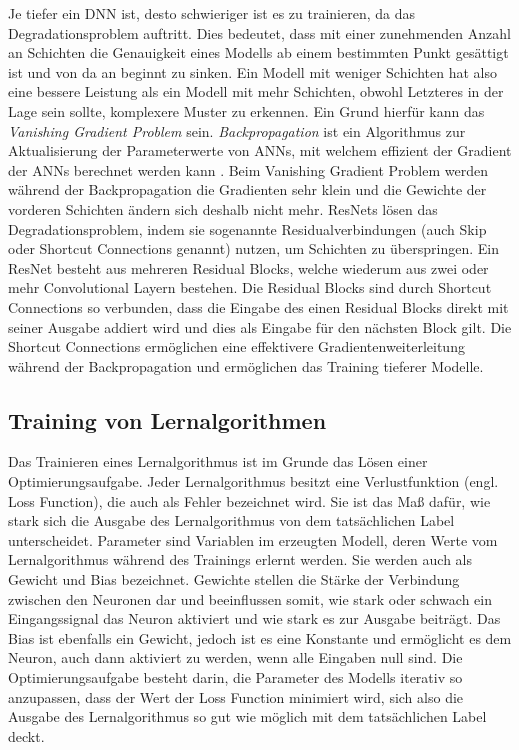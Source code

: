  
Je tiefer ein \gls{DNN} ist, desto schwieriger ist es zu trainieren, da das Degradationsproblem auftritt. Dies bedeutet, dass mit einer zunehmenden Anzahl an Schichten die Genauigkeit eines Modells ab einem bestimmten Punkt gesättigt ist und von da an beginnt zu sinken. Ein Modell mit weniger Schichten hat also eine bessere Leistung als ein Modell mit mehr Schichten, obwohl Letzteres in der Lage sein sollte, komplexere Muster zu erkennen. Ein Grund hierfür kann das \textit{Vanishing Gradient Problem} sein. \textit{Backpropagation} ist ein Algorithmus zur Aktualisierung der Parameterwerte von \gls{ANN}s, mit welchem effizient der Gradient der \gls{ANN}s berechnet werden kann \cite{burkov_machine_2019}. Beim Vanishing Gradient Problem werden während der Backpropagation die Gradienten sehr klein und die Gewichte der vorderen Schichten ändern sich deshalb nicht mehr. 
\glspl{ResNet} lösen das Degradationsproblem, indem sie sogenannte Residualverbindungen (auch Skip oder Shortcut Connections genannt) nutzen, um Schichten zu überspringen. Ein \gls{ResNet} besteht aus mehreren Residual Blocks, welche wiederum aus zwei oder mehr Convolutional Layern bestehen. Die Residual Blocks sind durch Shortcut Connections so verbunden, dass die Eingabe des einen Residual Blocks direkt mit seiner Ausgabe addiert wird und dies als Eingabe für den nächsten Block gilt. Die Shortcut Connections ermöglichen eine effektivere Gradientenweiterleitung während der Backpropagation und ermöglichen das Training tieferer Modelle. \cite{he_deep_2015}

\subsection{Training von Lernalgorithmen}

Das Trainieren eines Lernalgorithmus ist im Grunde das Lösen einer Optimierungsaufgabe. 
Jeder Lernalgorithmus besitzt eine Verlustfunktion (engl. Loss Function), die auch als Fehler bezeichnet wird. Sie ist das Maß dafür, wie stark sich die Ausgabe des Lernalgorithmus von dem tatsächlichen Label unterscheidet. Parameter sind Variablen im erzeugten Modell, deren Werte vom Lernalgorithmus während des Trainings erlernt werden. Sie werden auch als Gewicht und Bias bezeichnet. Gewichte stellen die Stärke der Verbindung zwischen den Neuronen dar und beeinflussen somit, wie stark oder schwach ein Eingangssignal das Neuron aktiviert und wie stark es zur Ausgabe beiträgt. Das Bias ist ebenfalls ein Gewicht, jedoch ist es eine Konstante und ermöglicht es dem Neuron, auch dann aktiviert zu werden, wenn alle Eingaben null sind. 
Die Optimierungsaufgabe besteht darin, die Parameter des Modells iterativ so anzupassen, dass der Wert der Loss Function minimiert wird, sich also die Ausgabe des Lernalgorithmus so gut wie möglich mit dem tatsächlichen Label deckt. \cite{burkov_machine_2019}


